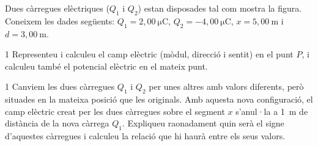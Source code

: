Dues càrregues elèctriques ($Q_1$ i $Q_2$) estan disposades tal com mostra la figura. Coneixem les dades següents: $Q_1 = 2,00\ \mathrm{\mu C}$, $Q_2 = -4,00\ \mathrm{\mu C}$, $x = 5,00\ \mathrm{m}$ i $d = 3,00\ \mathrm{m}$.


\begin{apartat}{1}
Representeu i calculeu el camp elèctric (mòdul, direcció i sentit) en el punt $P$, i calculeu també el potencial elèctric en el mateix punt.
\end{apartat}

\begin{apartat}{1}
Canviem les dues càrregues $Q_1$ i $Q_2$ per unes altres amb valors diferents, però situades en la mateixa posició que les originals. Amb aquesta nova configuració, el camp elèctric creat per les dues càrregues sobre el segment $x$ s'anul·la a 1~m de distància de la nova càrrega $Q_1$. Expliqueu raonadament quin serà el signe d'aquestes càrregues i calculeu la relació que hi haurà entre els seus valors.
\end{apartat}

